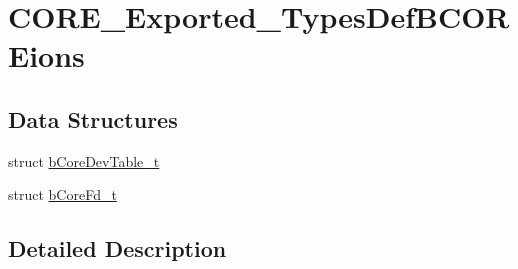 \hypertarget{group___c_o_r_e___exported___types_def_b_c_o_r_eions}{}\section{C\+O\+R\+E\+\_\+\+Exported\+\_\+\+Types\+Def\+B\+C\+O\+R\+Eions}
\label{group___c_o_r_e___exported___types_def_b_c_o_r_eions}
\subsection*{Data Structures}
\begin{DoxyCompactItemize}
\item 
struct \mbox{\hyperlink{structb_core_dev_table__t}{b\+Core\+Dev\+Table\+\_\+t}}
\item 
struct \mbox{\hyperlink{structb_core_fd__t}{b\+Core\+Fd\+\_\+t}}
\end{DoxyCompactItemize}


\subsection{Detailed Description}
